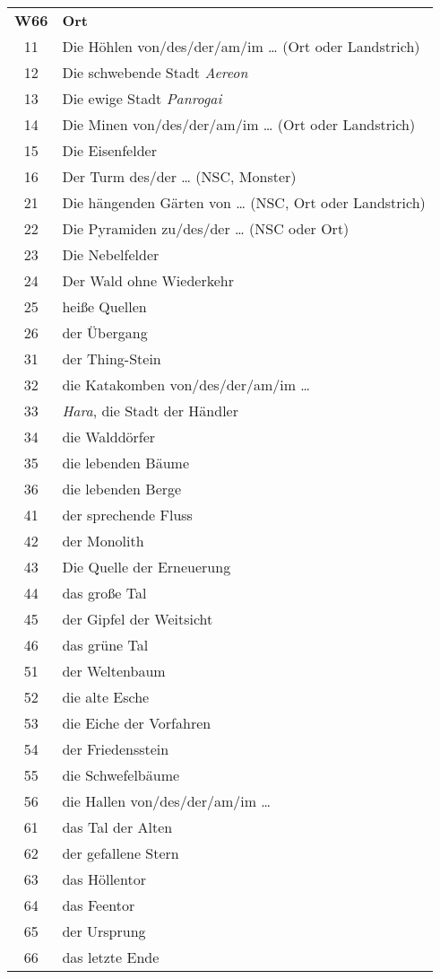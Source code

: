 \begin{tabularx}{\columnwidth}{cZ}
\textbf{W66} & \textbf{Ort} \\
11 & Die Höhlen von/des/der/am/im \ldots{} (Ort oder
Landstrich)\\
12 & Die schwebende Stadt \emph{Aereon}\\
13 & Die ewige Stadt \emph{Panrogai}\\
14 & Die Minen von/des/der/am/im \ldots{} (Ort oder
Landstrich)\\
15 & Die Eisenfelder\\
16 & Der Turm des/der \ldots{} (NSC, Monster)\\
21 & Die hängenden Gärten von \ldots{} (NSC, Ort oder
Landstrich)\\
22 & Die Pyramiden zu/des/der \ldots{} (NSC oder Ort)\\
23 & Die Nebelfelder\\
24 & Der Wald ohne Wiederkehr\\
25 & heiße Quellen\\
26 & der Übergang\\
31 & der Thing-Stein\\
32 & die Katakomben von/des/der/am/im \ldots{}\\
33 & \emph{Hara}, die Stadt der Händler\\
34 & die Walddörfer\\
35 & die lebenden Bäume\\
36 & die lebenden Berge\\
41 & der sprechende Fluss\\
42 & der Monolith\\
43 & Die Quelle der Erneuerung\\
44 & das große Tal\\
45 & der Gipfel der Weitsicht\\
46 & das grüne Tal\\
51 & der Weltenbaum\\
52 & die alte Esche\\
53 & die Eiche der Vorfahren\\
54 & der Friedensstein\\
55 & die Schwefelbäume\\
56 & die Hallen von/des/der/am/im \ldots{}\\
61 & das Tal der Alten\\
62 & der gefallene Stern\\
63 & das Höllentor\\
64 & das Feentor\\
65 & der Ursprung\\
66 & das letzte Ende\\
\end{tabularx}


